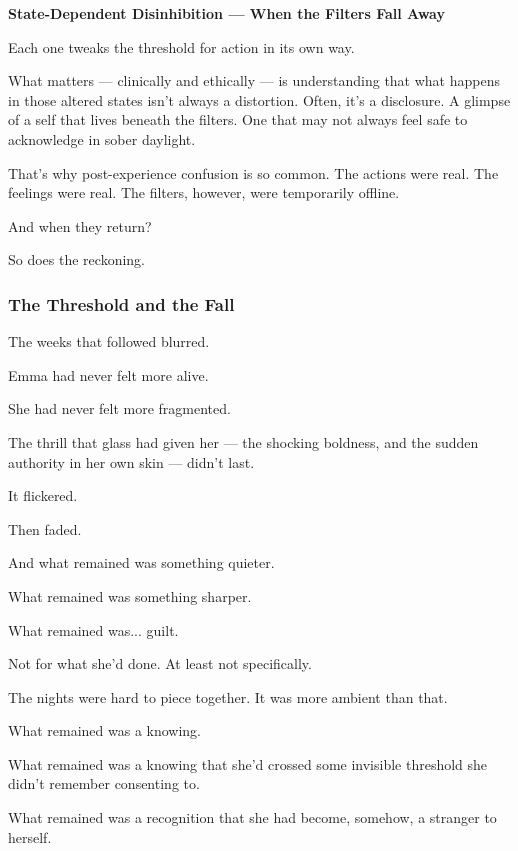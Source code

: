 \begin{TechnicalSidebar}{\textbf{State-Dependent Disinhibition — When the Filters Fall Away}}
  \medskip
  
  Each one tweaks the threshold for action in its own way.
  
  \medskip

  What matters — clinically and ethically — is understanding that what happens in those altered 
  states isn’t always a distortion. Often, it’s a disclosure. A glimpse of a self that lives beneath 
  the filters. One that may not always feel safe to acknowledge in sober daylight.

  \medskip
  
  That’s why post-experience confusion is so common. The actions were real. The feelings were real. 
  The filters, however, were temporarily offline.

  \medskip
  
  And when they return?

  \medskip
  
  So does the reckoning.
  
\end{TechnicalSidebar}

\subsubsection{The Threshold and the Fall}

The weeks that followed blurred.

Emma had never felt more alive.

She had never felt more fragmented. 

The thrill that glass had given her --- the shocking 
boldness, and the sudden authority in her own skin --- didn’t last.  

It flickered. 

Then faded. 

And what remained was something quieter. 

What remained was something sharper.

What remained was... guilt.

Not for what she’d done. At least not specifically. 

The nights were hard to piece together. 
It was more ambient than that. 

What remained was a knowing. 

What remained was a knowing that she'd crossed some invisible threshold she didn’t 
remember consenting to. 

What remained was a recognition that she had become, somehow, a stranger to herself.

